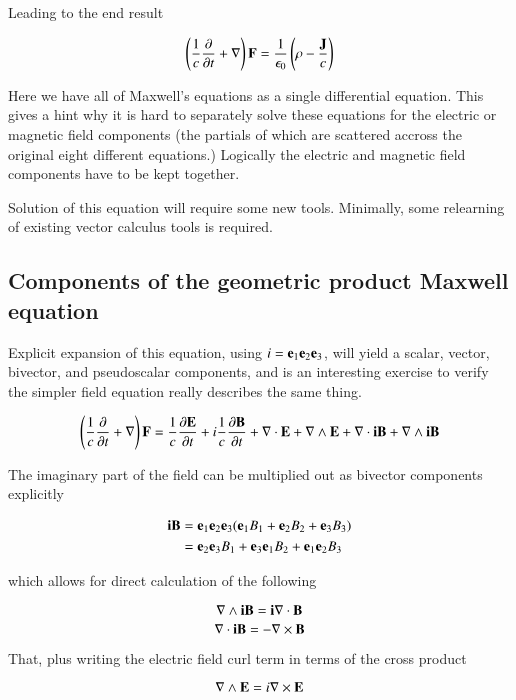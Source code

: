 \documentclass{article}      %
\begin{document}
Leading to the end result

\begin{equation}\label{eqn:maxwells}
\left(\frac{1}{c} \frac{\partial}{\partial t} + \nabla\right)\mathbf{F} = \frac {1} {\epsilon_0}\left(\rho - \frac{\mathbf{J}}{c}\right)
\end{equation}

Here we have all of Maxwell's equations as a single differential equation.
This gives a hint why it is hard to separately solve these equations for the electric or magnetic field components (the partials of which are scattered accross the original eight different equations.)  Logically the electric and magnetic field components have to be kept together.

Solution of this equation will require some new tools.  Minimally, some relearning of existing vector calculus tools is required.

\subsection{Components of the geometric product Maxwell equation }

Explicit expansion of this equation, using $i={\mathbf{e}}_1{\mathbf{e}}_2{\mathbf{e}}_3$, will yield a scalar, vector, bivector, and pseudoscalar components, and is an interesting exercise to verify the simpler field equation really describes the same thing.

\[
\left(\frac{1}{c} \frac{\partial}{\partial t} + \nabla\right)\mathbf{F}
= \frac{1}{c} \frac{\partial \mathbf{E}}{\partial t} + i\frac{1}{c} \frac{\partial \mathbf{B}}{\partial t}
+ \nabla \cdot \mathbf{E} + \nabla \wedge \mathbf{E} + \nabla \cdot \mathbf{i} \mathbf{B} + \nabla \wedge \mathbf{i} \mathbf{B}
\]

The imaginary part of the field can be multiplied out as bivector components explicitly

\begin{align*}
\mathbf{i} \mathbf{B} &= \mathbf{e} _1 \mathbf{e} _2 \mathbf{e} _3 ( \mathbf{e} _1 B_1 + \mathbf{e} _2 B_2 + \mathbf{e} _3 B_3 ) \\
&= \mathbf{e} _2 \mathbf{e} _3 B_1 + \mathbf{e} _3 \mathbf{e} _1 B_2 + \mathbf{e} _1 \mathbf{e} _2 B_3
\end{align*}

which allows for direct calculation of the following

\[
\nabla \wedge \mathbf{i}\mathbf{B} = \mathbf{i}\nabla \cdot \mathbf{B}
\]
\[
\nabla \cdot \mathbf{i}\mathbf{B} = -\nabla \times \mathbf{B}
\]

That, plus writing the electric field curl term in terms of the cross product

\[
\nabla \wedge \mathbf{E} = i \nabla \times \mathbf{E}
\]
\end{document}

